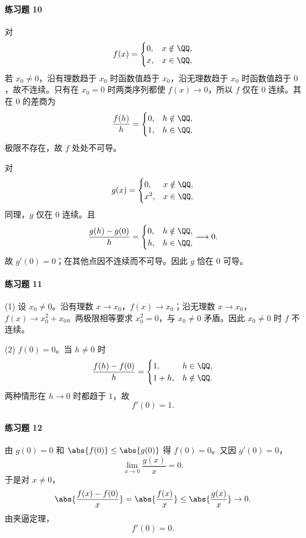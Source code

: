 \paragraph{练习题 10}
\begin{xsolution}
对
\[
  f(x)=\begin{cases}0,&x\notin\QQ,\\x,&x\in\QQ,
  \end{cases}
\]
若 $x_0\ne0$，沿有理数趋于 $x_0$ 时函数值趋于 $x_0$，沿无理数趋于 $x_0$ 时函数值趋于 $0$，故不连续。只有在 $x_0=0$ 时两类序列都使 $f(x)\to0$，所以 $f$ 仅在 $0$ 连续。其在 $0$ 的差商为
\[
  \frac{f(h)}h=\begin{cases}0,&h\notin\QQ,\\1,&h\in\QQ,
  \end{cases}
\]
极限不存在，故 $f$ 处处不可导。

对
\[
  g(x)=\begin{cases}0,&x\notin\QQ,\\x^2,&x\in\QQ,
  \end{cases}
\]
同理，$g$ 仅在 $0$ 连续。且
\[
  \frac{g(h)-g(0)}h=
  \begin{cases}
    0,&h\notin\QQ,\\
    h,&h\in\QQ,
  \end{cases}
  \longrightarrow0.
\]
故 $g'(0)=0$；在其他点因不连续而不可导。因此 $g$ 恰在 $0$ 可导。
\end{xsolution}

\paragraph{练习题 11}
\begin{xsolution}
(1) 设 $x_0\ne0$。沿有理数 $x\to x_0$，$f(x)\to x_0$；沿无理数 $x\to x_0$，$f(x)\to x_0^2+x_0$。两极限相等要求 $x_0^2=0$，与 $x_0\ne0$ 矛盾。因此 $x_0\ne0$ 时 $f$ 不连续。

(2) $f(0)=0$。当 $h\ne0$ 时
\[
  \frac{f(h)-f(0)}h=
  \begin{cases}
    1,&h\in\QQ,\\
    1+h,&h\notin\QQ.
  \end{cases}
\]
两种情形在 $h\to0$ 时都趋于 $1$，故
\[
  \boxed{f'(0)=1}.
\]
\end{xsolution}

\paragraph{练习题 12}
\begin{xsolution}
由 $g(0)=0$ 和 $\abs{f(0)}\le\abs{g(0)}$ 得 $f(0)=0$。又因 $g'(0)=0$，
\[
  \lim_{x\to0}\frac{g(x)}x=0.
\]
于是对 $x\ne0$，
\[
  \abs{\frac{f(x)-f(0)}x}
  =\abs{\frac{f(x)}x}
  \le\abs{\frac{g(x)}x}\to0.
\]
由夹逼定理，
\[
  \boxed{f'(0)=0}.
\]
\end{xsolution}

